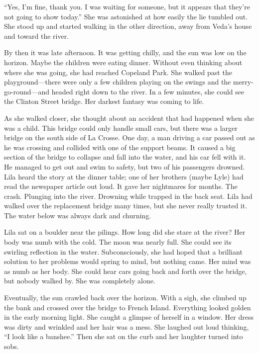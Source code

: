 \documentclass[
  letterpaper,
]{book}
\begin{document}
``Yes, I'm fine, thank you. I was waiting for someone, but it appears
that they're not going to show today.'' She was astonished at how easily
the lie tumbled out. She stood up and started walking in the other
direction, away from Veda's house and toward the river.

By then it was late afternoon. It was getting chilly, and the sun was
low on the horizon. Maybe the children were eating dinner. Without even
thinking about where she was going, she had reached Copeland Park. She
walked past the playground---there were only a few children playing on
the swings and the merry-go-round---and headed right down to the river.
In a few minutes, she could see the Clinton Street bridge. Her darkest
fantasy was coming to life.

As she walked closer, she thought about an accident that had happened
when she was a child. This bridge could only handle small cars, but
there was a larger bridge on the south side of La Crosse. One day, a man
driving a car passed out as he was crossing and collided with one of the
support beams. It caused a big section of the bridge to collapse and
fall into the water, and his car fell with it. He managed to get out and
swim to safety, but two of his passengers drowned. Lila heard the story
at the dinner table; one of her brothers (maybe Lyle) had read the
newspaper article out loud. It gave her nightmares for months. The
crash. Plunging into the river. Drowning while trapped in the back seat.
Lila had walked over the replacement bridge many times, but she never
really trusted it. The water below was always dark and churning.

Lila sat on a boulder near the pilings. How long did she stare at the
river? Her body was numb with the cold. The moon was nearly full. She
could see its swirling reflection in the water. Subconsciously, she had
hoped that a brilliant solution to her problems would spring to mind,
but nothing came. Her mind was as numb as her body. She could hear cars
going back and forth over the bridge, but nobody walked by. She was
completely alone.

Eventually, the sun crawled back over the horizon. With a sigh, she
climbed up the bank and crossed over the bridge to French Island.
Everything looked golden in the early morning light. She caught a
glimpse of herself in a window. Her dress was dirty and wrinkled and her
hair was a mess. She laughed out loud thinking, ``I look like a
banshee.'' Then she sat on the curb and her laughter turned into sobs.
\end{document}
